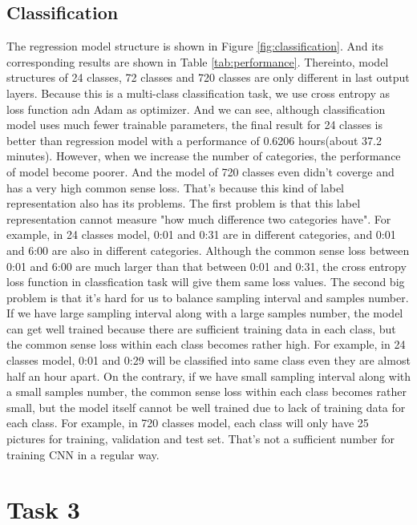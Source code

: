 \documentclass{article}
\begin{document}
\subsection{Classification}
The regression model structure is shown in Figure \ref{fig:classification}. And its corresponding results are shown in Table \ref{tab:performance}. Thereinto, model structures of 24 classes, 72 classes and 720 classes are only different in last output layers. Because this is a multi-class classification task, we use cross entropy as loss function adn Adam as optimizer. And we can see, although classification model uses much fewer trainable parameters, the final result for 24 classes is better than regression model with a performance of 0.6206 hours(about 37.2 minutes). However, when we increase the number of categories, the performance of model become poorer. And the model of 720 classes even didn't coverge and has a very high common sense loss. That's because this kind of label representation also has its problems. The first problem is that this label representation cannot measure "how much difference two categories have". For example, in 24 classes model, 0:01 and 0:31 are in different categories, and 0:01 and 6:00 are also in different categories. Although the common sense loss between 0:01 and 6:00 are much larger than that between 0:01 and 0:31, the cross entropy loss function in classfication task will give them same loss values. The second big problem is that it's hard for us to balance  sampling interval and samples number. If we have large sampling interval along with a large samples number, the model can get well trained because there are sufficient training data in each class, but the common sense loss within each class becomes rather high. For example, in 24 classes model, 0:01 and 0:29 will be classified into same class even they are almost half an hour apart. On the contrary, if we have small sampling interval along with a small samples number, the common sense loss within each class becomes rather small, but the model itself cannot be well trained due to lack of training data for each class. For example, in 720 classes model, each class will only have 25 pictures for training, validation and test set. That's not a sufficient number for training CNN in a regular way.


\section*{Task 3}
\setcounter{section}{3}
\end{document}
